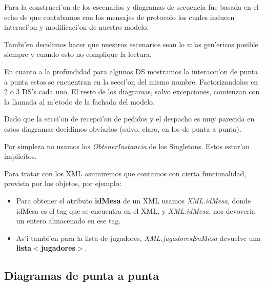 Para la construcci'on de los escenarios y diagramas de secuencia fue basada en el echo de que contabamos con los mensajes de protocolo los cuales inducen interaci'on y modificaci'on de nuestro modelo.

Tambi'en decidimos hacer que nuestros escenarios sean lo m'as gen'ericos posible siempre y cuando esto no complique la lectura. 

En cuanto a la profundidad para algunos DS mostramos la interacci'on de punta 
a punta estos se encuentran en la secci'on del mismo nombre.
Factorizandolos en 2 o 3 DS's cada uno. El resto de los diagramas, salvo excepciones, comienzan con la llamada al m'etodo de la fachada del modelo.

Dado que la secci'on de recepci'on de pedidos y el despacho es muy parecida en estos diagramas 
decidimos obviarlos (salvo, claro, en los de punta a punta).


Por simpleza no usamos los \textit{ObtenerInstancia} de los Singletons. Estos estar'an implicitos.


Para tratar con los XML asumiremos que contamos con cierta funcionalidad, provista por los objetos, por ejemplo:
\begin{itemize}
\item  Para obtener el atributo \textbf{idMesa} de un XML usamos \textit{XML.idMesa}, donde idMesa es el tag que se encuentra en el XML, y  \textit{XML.idMesa}, nos devoveria un entero almacenado en ese tag.

\item As'i tambi'en para la lista de jugadores, \textit{XML.jugadoresEnMesa} devuelve una \textbf{lista$<$jugadores$>$}.
\end{itemize}

% 
% 
% 
% 

\subsection{Diagramas de punta a punta}


